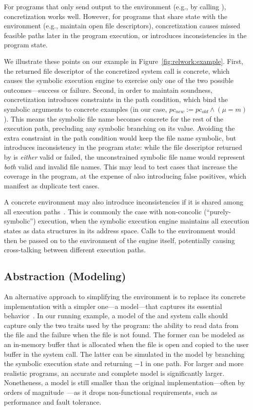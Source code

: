 For programs that only send output to the environment (e.g., by calling ), concretization works well.
%
However, for programs that share state with the environment (e.g., maintain open file descriptors), concretization causes missed feasible paths later in the program execution, or introduces inconsistencies in the program state.

We illustrate these points on our example in Figure~\ref{fig:relwork:example}.
%
First, the returned file descriptor of the concretized  system call is concrete, which causes the symbolic execution engine to exercise only one of the two possible outcomes---success or failure.
%
Second, in order to maintain soundness, concretization introduces constraints in the path condition, which bind the symbolic arguments to concrete examples (in our case, $pc_{new} := pc_{old} \wedge (\mu = m)$).
%
This means the symbolic file name becomes concrete for the rest of the execution path, precluding any symbolic branching on its value.
%
Avoiding the extra constraint in the path condition would keep the file name symbolic, but introduces inconsistency in the program state: while the file descriptor returned by  is \emph{either} valid or failed, the unconstrained symbolic file name would represent \emph{both} valid and invalid file names.
%
This may lead to test cases that increase the coverage in the program, at the expense of also introducing false positives, which manifest as duplicate test cases.

A concrete environment may also introduce inconsistencies if it is shared among all execution paths~\cite{klee}.
%
This is commonly the case with non-concolic (``purely-symbolic'') execution, when the symbolic execution engine maintains all execution states as data structures in its address space.  Calls to the environment would then be passed on to the environment of the engine itself, potentially causing cross-talking between different execution paths.

\subsection{Abstraction (Modeling)}

An alternative approach to simplifying the environment is to replace its concrete implementation with a simpler one---a model---that captures its essential behavior~\cite{klee,mayhem,aeg}.
%
In our running example, a model of the  and  system calls should capture only the two traits used by the program: the ability to read data from the file and the failure when the file is not found.
%
The former can be modeled as an in-memory buffer that is allocated when the file is open and copied to the user buffer in the  system call.
%
The latter can be simulated in the model by branching the symbolic execution state and returning $-1$ in one path.
%
For larger and more realistic programs, an accurate and complete model is significantly larger.  Nonetheness, a model is still smaller than the original implementation---often by orders of magnitude~\cite{klee}---as it drops non-functional requirements, such as performance and fault tolerance.

